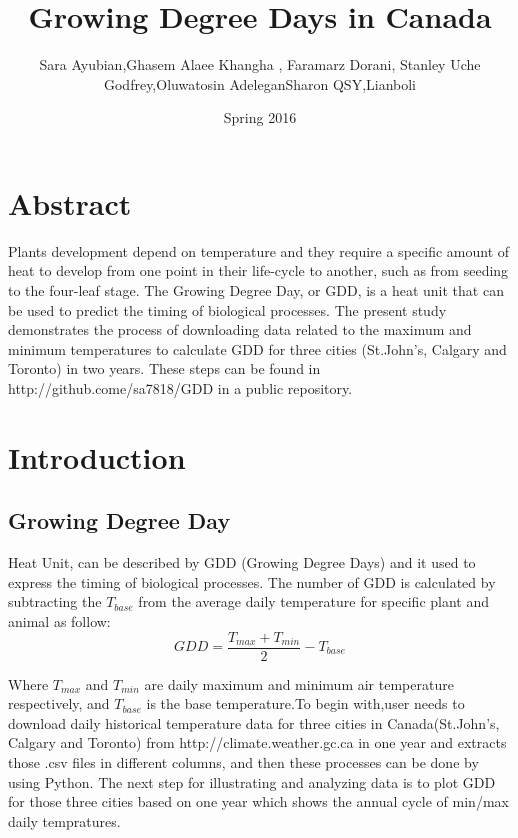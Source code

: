 \documentclass[DIV=calc, paper=a4, fontsize=11pt, twocolumn]{scrartcl}
\title{Growing Degree Days in Canada}
\author{Sara Ayubian\affmark[1]    ,Ghasem Alaee Khangha \affmark[1],    Faramarz Dorani\affmark[1],
Stanley Uche Godfrey\affmark[1],Oluwatosin Adelegan\affmark[1]
Sharon QSY\affmark[1],Lianboli\affmark[1]}
\date{Spring 2016}
\newcommand{\initial}[1]{ 
\lettrine[lines=3,lhang=0.3,nindent=0em]{
\color{DarkGoldenrod}
{\textsf{#1}}}{}}
\begin{document}
\maketitle 
\thispagestyle{fancy} 
\section{Abstract}

\initial{P}lants development depend on temperature and they require a specific amount of heat to develop from one point in their life-cycle to another, such as from seeding to the four-leaf stage. The Growing Degree Day, or GDD, is a heat unit that can be used to predict the timing of biological processes. The present study demonstrates the process of downloading data related to the maximum and minimum temperatures to calculate GDD for three cities (St.John's, Calgary and Toronto) in two years. These steps can be found in http://github.come/sa7818/GDD in a public repository.
	
	
	
\section{Introduction}
\subsection{Growing Degree Day}

Heat Unit, can be described by GDD (Growing Degree Days) and it used to express the timing of biological processes. The number of GDD is calculated by subtracting the $T_{base}$ from the average daily temperature for specific plant and animal as follow:
\begin{equation}
GDD =\frac {T_{max}+T_{min}}{2}-T_{base}
\end{equation}

Where $T_{max}$ and $T_{min}$ are daily maximum and minimum air temperature respectively, and $T_{base}$ is the base temperature.To begin with,user needs to download daily historical temperature data for three cities in Canada(St.John's, Calgary and Toronto) from http://climate.weather.gc.ca in one year and extracts those .csv files in different columns, and then these processes can be done by using Python.
The next step for illustrating and analyzing data is to plot GDD for those three cities based on one year which shows the annual cycle of min/max daily tempratures.
\end{document}
